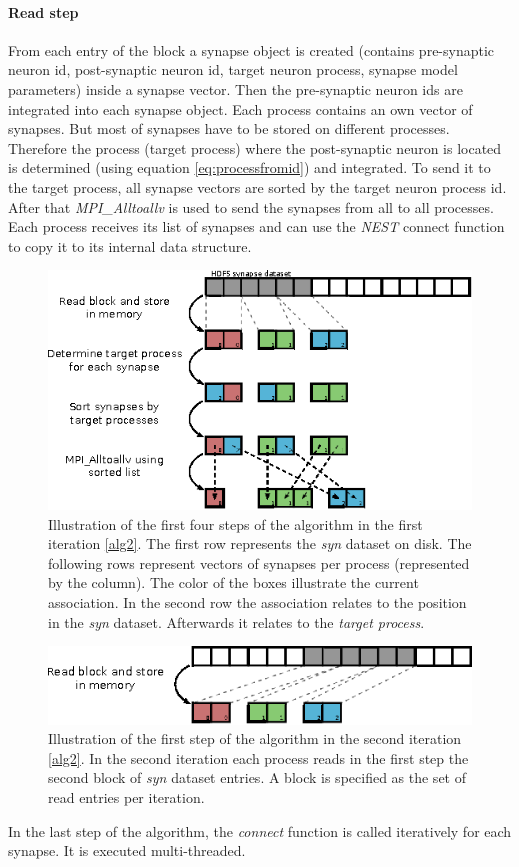 \paragraph{Read step}
From each entry of the block a synapse object is created
(contains pre-synaptic neuron id, post-synaptic neuron id, target neuron process, synapse model parameters)
inside a synapse vector. Then the pre-synaptic neuron ids are integrated into each synapse object.
Each process contains an own vector of synapses.
But most of synapses have to be stored on different processes.
Therefore the process (target process) where the post-synaptic neuron is located is determined (using equation \ref{eq:processfromid})
and integrated.
To send it to the target process, all synapse vectors are sorted by the target neuron process id.
After that \emph{MPI\_Alltoallv} is used to send the synapses from all to all processes.
Each process receives its list of synapses and can use the \emph{NEST} connect function to copy it to its internal data structure.
\begin{figure}[ht!]
\centering
\includegraphics[scale=2.0]{pictures/import_syn_vis.eps}
\caption{Illustration of the first four steps of the algorithm in the first iteration \ref{alg2}.
The first row represents the \emph{syn} dataset on disk.
The following rows represent vectors of synapses per process (represented by the column).
The color of the boxes illustrate the current association.
In the second row the association relates to the position in the \emph{syn} dataset.
Afterwards it relates to the \emph{target process}.
}
\label{fig:importsynvis}
\end{figure}

\begin{figure}[ht!]
\centering
\includegraphics[scale=2.0]{pictures/import_syn_vis_second_it.eps}
\caption{Illustration of the first step of the algorithm in the second iteration \ref{alg2}.
In the second iteration each process reads in the first step the second block of \emph{syn} dataset entries.
A block is specified as the set of read entries per iteration.}
\label{fig:importsynvis2nd}
\end{figure}
\newpage
In the last step of the algorithm, the \emph{connect} function is called iteratively for each synapse.
It is executed multi-threaded.

